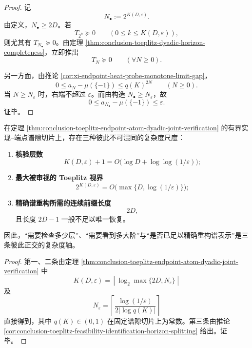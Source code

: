 \begin{proof}
记
\[
N_\bullet:=2^{K(D,\varepsilon)}.
\]
由定义，\(N_\bullet\ge 2D\)。若
\[
T_{2^k}\succeq 0
\qquad (0\le k\le K(D,\varepsilon)),
\]
则尤其有 \(T_{N_\bullet}\succeq 0\)。由定理 \ref{thm:conclusion-toeplitz-dyadic-horizon-completeness}，立即推出
\[
T_N\succeq 0
\qquad (\forall N\ge 0).
\]

另一方面，由推论 \ref{cor:xi-endpoint-heat-probe-monotone-limit-gap}，
\[
0\le a_N-\mu(\{-1\})\le q(K)^{2N}
\qquad (N\ge 0).
\]
当 \(N\ge N_\varepsilon\) 时，右端不超过 \(\varepsilon\)。而由构造 \(N_\bullet\ge N_\varepsilon\)，故
\[
0\le a_{N_\bullet}-\mu(\{-1\})\le \varepsilon.
\]
证毕。
\end{proof}

\begin{corollary}\label{cor:conclusion-toeplitz-three-way-complexity-splitting}
在定理 \ref{thm:conclusion-toeplitz-endpoint-atom-dyadic-joint-verification} 的有界实现--端点谱隙切片上，存在三种彼此不可混同的复杂度尺度：
\begin{enumerate}
  \item \textbf{核验层数}
  \[
  K(D,\varepsilon)+1
  =
  O\bigl(\log D+\log\log(1/\varepsilon)\bigr);
  \]
  \item \textbf{最大被审视的 Toeplitz 视界}
  \[
  2^{K(D,\varepsilon)}
  =
  O\bigl(\max\{D,\log(1/\varepsilon)\}\bigr);
  \]
  \item \textbf{精确谱重构所需的连续前缀长度}
  \[
  2D,
  \]
  且长度 \(2D-1\) 一般不足以唯一恢复。
\end{enumerate}
因此，“需要检查多少层”、“需要看到多大阶”与“是否已足以精确重构谱表示”是三条彼此正交的复杂度轴。
\end{corollary}

\begin{proof}
第一、二条由定理 \ref{thm:conclusion-toeplitz-endpoint-atom-dyadic-joint-verification} 中
\[
K(D,\varepsilon)=
\left\lceil
\log_2 \max\{2D,N_\varepsilon\}
\right\rceil
\]
及
\[
N_\varepsilon=
\left\lceil \frac{\log(1/\varepsilon)}{2|\log q(K)|}\right\rceil
\]
直接得到，其中 \(q(K)\in(0,1)\) 在固定谱隙切片上为常数。第三条由推论 \ref{cor:conclusion-toeplitz-feasibility-identification-horizon-splitting} 给出。证毕。
\end{proof}

